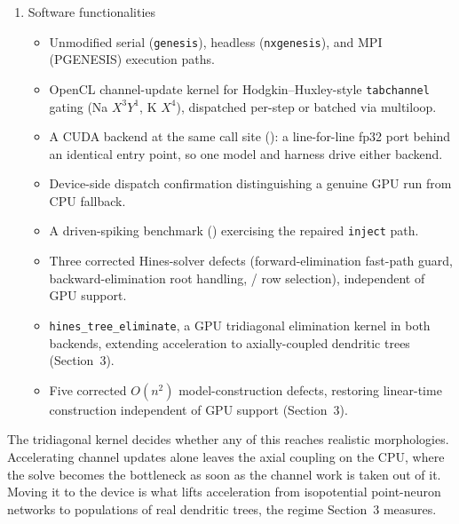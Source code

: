 \documentclass[preprint,12pt, a4paper]{elsarticle}
\newcommand{\hte}{\texttt{hines\_\allowbreak tree\_\allowbreak eliminate}}
\begin{document}
\begin{enumerate}
\begin{enumerate}
  Synaptically coupled spiking networks reach the kernels in this release. \texttt{hsolve} tracked one spike generator per solver, so such a network had to be built as one solver per cell; it now tracks one per compartment, and a whole layer becomes a single solver whose single-compartment solve the channel kernel completes on the device. One boundary remains, and it is a scheduling one rather than a kernel one: a network with zero axonal delay exchanges spikes every step, so multiloop batching does not apply and each step pays a dispatch. Section~3 measures what that costs.

  \item Software functionalities

  \begin{itemize}
    \item Unmodified serial (\texttt{genesis}), headless (\texttt{nxgenesis}), and MPI (PGENESIS) execution paths.
    \item OpenCL channel-update kernel for Hodgkin--Huxley-style \texttt{tabchannel} gating (Na $X^3Y^1$, K $X^4$), dispatched per-step or batched via multiloop.
    \item A CUDA backend at the same call site (): a line-for-line fp32 port behind an identical entry point, so one model and harness drive either backend.
    \item Device-side dispatch confirmation distinguishing a genuine GPU run from CPU fallback.
    \item A driven-spiking benchmark () exercising the repaired \texttt{inject} path.
    \item Three corrected Hines-solver defects (forward-elimination fast-path guard, backward-elimination root handling, / row selection), independent of GPU support.
    \item \hte{}, a GPU tridiagonal elimination kernel in both backends, extending acceleration to axially-coupled dendritic trees (Section~3).
    \item Five corrected $O(n^2)$ model-construction defects, restoring linear-time construction independent of GPU support (Section~3).
  \end{itemize}
\end{enumerate}

The tridiagonal kernel decides whether any of this reaches realistic morphologies. Accelerating channel updates alone leaves the axial coupling on the CPU, where the solve becomes the bottleneck as soon as the channel work is taken out of it. Moving it to the device is what lifts acceleration from isopotential point-neuron networks to populations of real dendritic trees, the regime Section~3 measures.


\end{enumerate}
\end{document}
